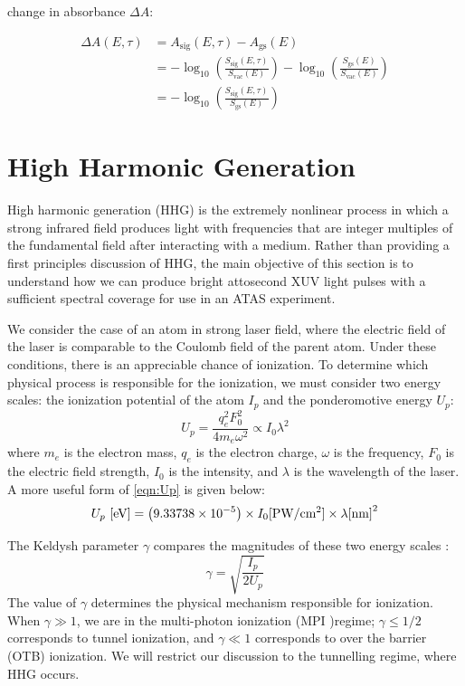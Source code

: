 change in absorbance $\Delta A$:

\begin{align}
\Delta A (E, \tau) &= A_{\textrm{sig}}(E,\tau) - A_{\textrm{gs}} (E) \nonumber \\
&= -\log_{10} \left( \frac{S_{\textrm{sig}}(E, \tau)}{ S_{\textrm{vac}} (E)} \right) -\log_{10} \left( \frac{S_{\textrm{gs}}(E)}{ S_{\textrm{vac}} (E)} \right) \nonumber \\
&= -\log_{10} \left( \frac{S_{\textrm{sig}} (E, \tau)}{ S_{\textrm{gs}} (E)} \right)
\end{align}

\section{High Harmonic Generation}

\label{sec:HHG}

High harmonic generation (HHG) is the extremely nonlinear process in which a strong infrared field produces light with frequencies that are integer multiples of the fundamental field after interacting with a medium. Rather than providing a first principles discussion of HHG, the main objective of this section is to understand how we can produce bright attosecond XUV light pulses with a sufficient spectral coverage for use in an ATAS experiment.


We consider the case of an atom in strong laser field, where the electric field of the laser is comparable to the Coulomb field of the parent atom. Under these conditions, there is an appreciable chance of ionization. To determine which physical process is responsible for the ionization, we must consider two energy scales: the ionization potential of the atom $I_p$ and the ponderomotive energy $U_p$:
\begin{equation}
U_p = \frac{q_e^2 F_0^2}{4 m_e \omega^2} \propto I_0 \lambda^2
\label{eqn:Up}
\end{equation}
where $m_e$ is the electron mass, $q_e$ is the electron charge, $\omega$ is the frequency, $F_0$ is the electric field strength, $I_0$ is the intensity, and $\lambda$ is the wavelength of the laser. A more useful form of \cref{eqn:Up} is given below:
\begin{equation}
U_p \textrm{ [eV]} = \left( 9.33738 \times 10^{-5} \right) \times I_0 \textrm{[PW/cm\textsuperscript{2}]} \times \lambda\textrm{[nm]}^2
\label{eqn:Up-numbers}
\end{equation}

The Keldysh parameter $\gamma$ compares the magnitudes of these two energy scales \cite{keldyshIonizationFieldStrong1965}:
\begin{equation}
\gamma = \sqrt{\frac{I_p}{2 U_p}}
\end{equation}
The value of $\gamma$ determines the physical mechanism responsible for ionization. When $\gamma \gg 1$, we are in the multi-photon ionization (MPI )regime; $\gamma \le 1/2$ corresponds to tunnel ionization, and $\gamma \ll 1$ corresponds to over the barrier (OTB) ionization. We will restrict our discussion to the tunnelling regime, where HHG occurs.

